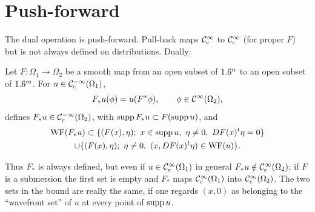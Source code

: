 \section{Push-forward}\label{microlocal:sec:pushforward}

The dual operation is push-forward. Pull-back maps $\mathcal{C}^\infty_{\mathrm{c}}$ to $\mathcal{C}^\infty_{\mathrm{c}}$ (for
proper $F$) but is not always defined on distributions. Dually:

\begin{theorem}\label{microlocal:thm:pushforward}
  Let $F:\Omega_1\to\Omega_2$ be a smooth map from an open subset of $1.6^n$ to
  an open subset of $1.6^m$. For $u\in\mathcal{C}^{-\infty}_{\mathrm{c}}(\Omega_1)$,
  \begin{equation*}
    F_*u(\phi)=u(F^*\phi),\qquad\phi\in\mathcal{C}^\infty(\Omega_2),
  \end{equation*}
  defines $F_*u\in\mathcal{C}^{-\infty}_{\mathrm{c}}(\Omega_2)$, with $\operatorname{supp} F_*u\subset F(\operatorname{supp} u)$, and
  \begin{multline*}
    \WF(F_*u)\subset\{(F(x),\eta);\ x\in\supp u,\ \eta\ne0,\ DF(x)^t\eta=0\}\\
    \cup\{(F(x),\eta);\ \eta\ne0,\ (x,DF(x)^t\eta)\in\WF(u)\}.
  \end{multline*}
\end{theorem}

Thus $F_*$ is always defined, but even if $u\in\mathcal{C}^\infty_{\mathrm{c}}(\Omega_1)$ in general
$F_*u\notin\mathcal{C}^\infty_{\mathrm{c}}(\Omega_2)$; if $F$ is a submersion the first set is empty and
$F_*$ maps $\mathcal{C}^\infty_{\mathrm{c}}(\Omega_1)$ into $\mathcal{C}^\infty_{\mathrm{c}}(\Omega_2)$. The two sets in the bound
are really the same, if one regards $(x,0)$ as belonging to the ``wavefront
set'' of $u$ at every point of $\operatorname{supp} u$.

